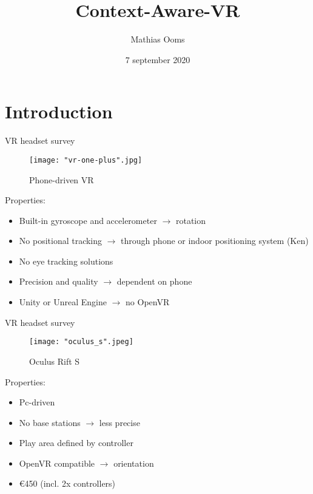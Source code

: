 \documentclass{beamer}
\title[Your Short Title]{Context-Aware-VR}
\author{Mathias Ooms}
\institute{University of Antwerp}
\date{7 september 2020}
\begin{document}
\begin{frame}
  \titlepage
\end{frame}


\section{Introduction}


\begin{frame}{VR headset survey}
	\begin{figure}
		\texttt{[image: "vr-one-plus".jpg]}
		\caption{Phone-driven VR}
	\end{figure}
	
	Properties:
	\begin{itemize}
		\item Built-in gyroscope and accelerometer $\rightarrow$ rotation
		\item No positional tracking $\rightarrow$ through phone or indoor positioning system (Ken)
		\item No eye tracking solutions
		\item Precision and quality $\rightarrow$ dependent on phone
		\item Unity or Unreal Engine $\rightarrow$ no OpenVR
	\end{itemize}
\end{frame}


\begin{frame}{VR headset survey}
	\begin{figure}
		\texttt{[image: "oculus\_s".jpeg]}
		\caption{Oculus Rift S}
	\end{figure}
	
	Properties:
	\begin{itemize}
		\item Pc-driven
	    \item No base stations $\rightarrow$ less precise
	    \item Play area defined by controller
      	\item OpenVR compatible $\rightarrow$ orientation
		\item €450 (incl. 2x controllers)
	\end{itemize}
\end{frame}
\end{document}

